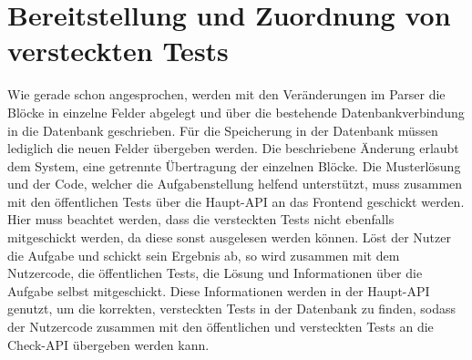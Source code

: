 \section{Bereitstellung und Zuordnung von versteckten Tests}
Wie gerade schon angesprochen, werden mit den Veränderungen im Parser die Blöcke in einzelne Felder abgelegt und über die bestehende Datenbankverbindung in die Datenbank geschrieben. Für die Speicherung in der Datenbank müssen lediglich die neuen Felder übergeben werden. Die beschriebene Änderung erlaubt dem System, eine getrennte Übertragung der einzelnen Blöcke. Die Musterlösung und der Code, welcher die Aufgabenstellung helfend unterstützt, muss zusammen mit den öffentlichen Tests über die Haupt-API an das Frontend geschickt werden. Hier muss beachtet werden, dass die versteckten Tests nicht ebenfalls mitgeschickt werden, da diese sonst ausgelesen werden können. Löst der Nutzer die Aufgabe und schickt sein Ergebnis ab, so wird zusammen mit dem Nutzercode, die öffentlichen Tests, die Lösung und Informationen über die Aufgabe selbst mitgeschickt. Diese Informationen werden in der Haupt-API genutzt, um die korrekten, versteckten Tests in der Datenbank zu finden, sodass der Nutzercode zusammen mit den öffentlichen und versteckten Tests an die Check-API übergeben werden kann.


